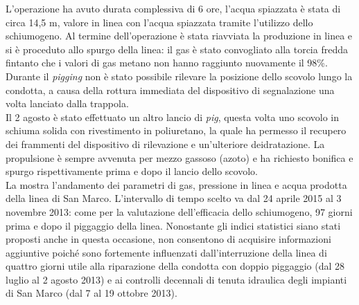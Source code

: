 L'operazione ha avuto durata complessiva di 6 ore, l'acqua spiazzata è stata di circa 14,5 m, valore in linea con l'acqua spiazzata tramite l'utilizzo dello schiumogeno. Al termine dell'operazione è stata riavviata la produzione in linea e si è proceduto allo spurgo della linea: il gas è stato convogliato alla torcia fredda fintanto che i valori di gas metano non hanno raggiunto nuovamente il 98\%. Durante il \textit{pigging} non è stato possibile rilevare la posizione dello scovolo lungo la condotta, a causa della rottura immediata del dispositivo di segnalazione una volta lanciato dalla trappola.\\
Il 2 agosto è stato effettuato un altro lancio di \textit{pig}, questa volta uno scovolo in schiuma solida con rivestimento in poliuretano, la quale ha permesso il recupero dei frammenti del dispositivo di rilevazione e un'ulteriore deidratazione. La propulsione è sempre avvenuta per mezzo gassoso (azoto) e ha richiesto bonifica e spurgo rispettivamente prima e dopo il lancio dello scovolo.\\
La  mostra l'andamento dei parametri di gas, pressione in linea e acqua prodotta della linea di San Marco. L'intervallo di tempo scelto va dal 24 aprile 2015 al 3 novembre 2013: come per la valutazione dell'efficacia dello schiumogeno, 97 giorni prima e dopo il piggaggio della linea. Nonostante gli indici statistici siano stati proposti anche in questa occasione, non consentono di acquisire informazioni aggiuntive poiché sono fortemente influenzati dall'interruzione della linea di quattro giorni utile alla riparazione della condotta con doppio piggaggio (dal 28 luglio al 2 agosto 2013) e ai controlli decennali di tenuta idraulica degli impianti di San Marco (dal 7 al 19 ottobre 2013).
